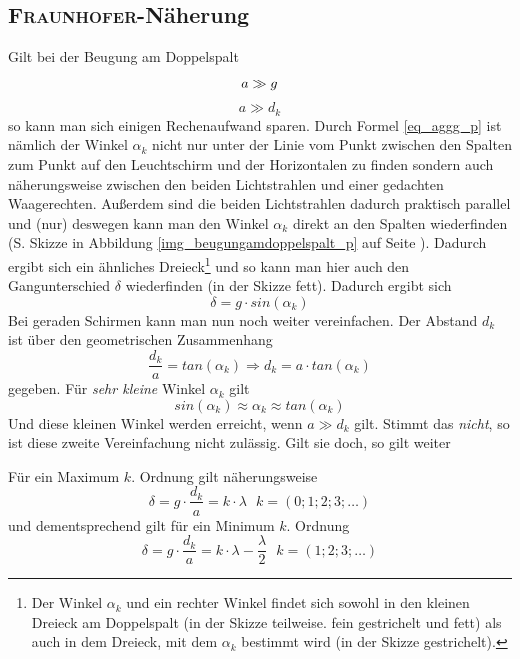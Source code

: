 		\subsection{\textsc{Fraunhofer}-Näherung} 
		\label{fraunhofer_naehrung}
Gilt bei der Beugung am Doppelspalt
\begin{equation}
a \gg g\\
 	\label{eq_aggg_p}
 \end{equation}
 \begin{equation}
a \gg d_k
 	\label{eq_aggdk_p}
\end{equation}
so kann man sich einigen Rechenaufwand sparen. Durch Formel \ref{eq_aggg_p} ist nämlich der Winkel \(\alpha_k\) nicht nur unter der Linie vom Punkt zwischen den Spalten zum Punkt auf den Leuchtschirm und der Horizontalen zu finden sondern auch näherungsweise zwischen den beiden Lichtstrahlen und einer gedachten Waagerechten. Außerdem sind die beiden Lichtstrahlen dadurch praktisch parallel und (nur) deswegen kann man den Winkel \(\alpha_k\) direkt an den Spalten wiederfinden (S. Skizze in Abbildung \ref{img_beugungamdoppelspalt_p} auf Seite \pageref{img_beugungamdoppelspalt_p}). Dadurch ergibt sich ein ähnliches Dreieck\footnote{Der Winkel \(\alpha_k\) und ein rechter Winkel findet sich sowohl in den kleinen Dreieck am Doppelspalt (in der Skizze teilweise. fein gestrichelt und fett) als auch in dem Dreieck, mit dem \(\alpha_k\) bestimmt wird (in der Skizze gestrichelt).} und so kann man hier auch den Gangunterschied \(\delta\) wiederfinden (in der Skizze fett). Dadurch ergibt sich
\begin{equation}
 	\delta = g \cdot sin(\alpha_k)
 		\label{eq_gangunterschied_doppelspalt_p}
\end{equation}
Bei geraden Schirmen kann man nun noch weiter vereinfachen. Der Abstand \(d_k\) ist über den geometrischen Zusammenhang
\begin{equation}
 	\frac{d_k}{a} = tan(\alpha_k) \Rightarrow d_k = a \cdot tan(\alpha_k)
 		\label{eq_doppelspalttangens_p}
\end{equation}
gegeben. Für \emph{sehr kleine} Winkel \(\alpha_k\) gilt
\begin{equation}
 	sin(\alpha_k) \approx \alpha_k \approx tan(\alpha_k)
 		\label{eq_winkelnaehrung_p}
\end{equation}
Und diese kleinen Winkel werden erreicht, wenn \(a \gg d_k\) gilt. Stimmt das \emph{nicht}, so ist diese zweite Vereinfachung nicht zulässig. Gilt sie doch, so gilt weiter

Für ein Maximum \(k\). Ordnung gilt näherungsweise
\begin{equation}
 \delta = g \cdot \frac{d_k}{a} = k \cdot \lambda ~~~ k = (0; 1; 2; 3; \ldots)
\end{equation}
und dementsprechend gilt für ein Minimum \(k\). Ordnung
\begin{equation}
 \delta = g \cdot \frac{d_k}{a} = k \cdot \lambda - \frac{\lambda}{2} ~~~ k = (1; 2; 3; \ldots)
\end{equation}




